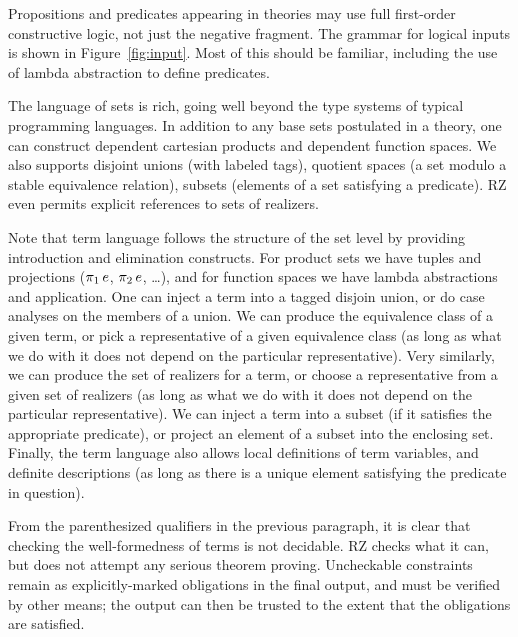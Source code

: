 Propositions and predicates appearing in theories may use full
first-order constructive logic, not just the negative fragment. The
grammar for logical inputs is shown in Figure~\ref{fig:input}. Most of
this should be familiar, including the use of lambda abstraction to
define predicates.

The language of sets is rich, going well beyond the type systems of
typical programming languages. In addition to any base sets postulated
in a theory, one can construct dependent cartesian products and
dependent function spaces. We also supports disjoint unions (with
labeled tags), quotient spaces (a set modulo a stable equivalence
relation), subsets (elements of a set satisfying a predicate). RZ even
permits explicit references to sets of realizers.
\fi

Note that term language follows the structure of the set level by providing
introduction and elimination constructs. For product sets we have
tuples and projections ($\mathop{\pi_{1}} e$, $\mathop{\pi_{2}} e$, \ldots),
and for function spaces we have lambda abstractions and application.
One can inject a term into a tagged disjoin union, or do case analyses
on the members of a union. We can produce the equivalence class of a
given term, or pick a representative of a given equivalence class (as
long as what we do with it does not depend on the particular
representative). Very similarly, we can produce the set of realizers
for a term, or choose a representative from a given set of realizers
(as long as what we do with it does not depend on the particular
representative). We can inject a term into a subset (if it satisfies
the appropriate predicate), or project an element of a subset into the
enclosing set. Finally, the term language also allows local
definitions of term variables, and definite descriptions (as long as
there is a unique element satisfying the predicate in question).

From the parenthesized qualifiers in the previous paragraph, it is
clear that checking the well-formedness of terms is not decidable. RZ
checks what it can, but does not attempt any serious theorem proving.
Uncheckable constraints remain as explicitly-marked obligations
in the final output, and must be verified by other means; the output
can then be trusted to the extent that the obligations are satisfied.


